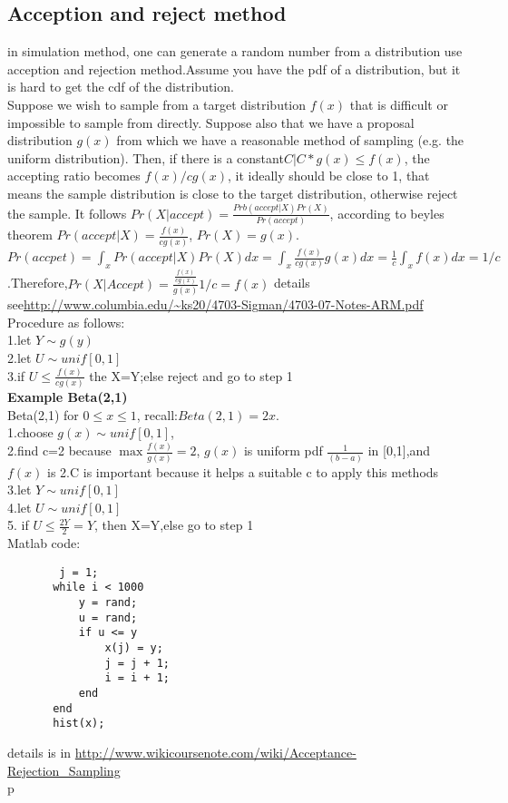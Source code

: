 \documentclass[a4paper,11pt]{article}
\begin{document}
\subsection{Acception and reject method}
in simulation method, one can generate a random number from a distribution use acception and rejection method.Assume you have the pdf of a distribution, but it is hard to get the cdf of the distribution.\\
Suppose we wish to sample from a target distribution $f(x)$ that is difficult or impossible to sample from directly. Suppose also that we have a proposal distribution $g(x)$ from which we have a reasonable method of sampling (e.g. the uniform distribution). Then, if there is a constant$C|C*g(x)\leq f(x)$, the accepting ratio becomes $f(x)/cg(x)$, it ideally should be close to 1, that means the sample distribution is close to the target distribution, otherwise reject the sample. It follows $Pr(X|accept)=\frac{Prb(accept|X) Pr(X)}{Pr(accept)}$, according to beyles theorem $Pr(accept|X)=\frac{f(x)}{c g(x)}$,  $Pr(X)=g(x)$. $Pr(accpet)=\int_x Pr(accept|X)Pr(X) dx=\int_x \frac{f(x)}{cg(x)}g(x)dx=\frac{1}{c}\int_x f(x)dx=1/c$.Therefore,$Pr(X|Accept)=\frac{\frac{f(x)}{cg(x)}}{g(x)}{1/c}=f(x)$
details see\url{http://www.columbia.edu/~ks20/4703-Sigman/4703-07-Notes-ARM.pdf}\\
Procedure as follows:\\
1.let $Y\sim g(y)$\\
2.let $U\sim unif[0,1]$\\
3.if $U\leq \frac{f(x)}{cg(x)}$ the X=Y;else reject and go to step 1\\
{\bf Example Beta(2,1)}\\
Beta(2,1) for $0\leq x \leq 1$, recall:$Beta(2,1)=2x$.\\
 1.choose $g(x)\sim unif[0,1]$, \\
 2.find c=2 because $\max\frac{f(x)}{g(x)}=2$, $g(x)$ is uniform pdf $\frac{1}{(b-a)}$ in [0,1],and $f(x)$ is 2.C is important because it helps a suitable c to apply this methods\\
 3.let $Y\sim unif[0,1]$\\
 4.let $U\sim unif[0,1]$\\
 5. if $U\leq \frac{2Y}{2}=Y$, then X=Y,else go to step 1\\
 Matlab code:\\
   \begin{verbatim}
        j = 1;
       while i < 1000
           y = rand;
           u = rand;
           if u <= y
               x(j) = y;
               j = j + 1;
               i = i + 1;
           end
       end
       hist(x);
   \end{verbatim}
details is in \url{http://www.wikicoursenote.com/wiki/Acceptance-Rejection_Sampling}\\p
\end{document}
